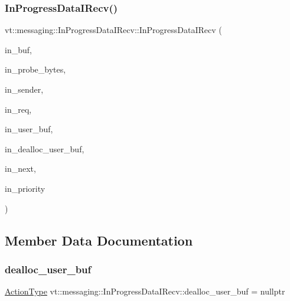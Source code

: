 \subsubsection{\texorpdfstring{In\+Progress\+Data\+I\+Recv()}{InProgressDataIRecv()}}
{\footnotesize\ttfamily vt\+::messaging\+::\+In\+Progress\+Data\+I\+Recv\+::\+In\+Progress\+Data\+I\+Recv (\begin{DoxyParamCaption}\item[{char $\ast$}]{in\+\_\+buf,  }\item[{\hyperlink{structvt_1_1messaging_1_1_in_progress_i_recv_a2a3824ca08dcfc5a3278882c1df8edd6}{Count\+Type}}]{in\+\_\+probe\+\_\+bytes,  }\item[{\hyperlink{namespacevt_a866da9d0efc19c0a1ce79e9e492f47e2}{Node\+Type}}]{in\+\_\+sender,  }\item[{M\+P\+I\+\_\+\+Request}]{in\+\_\+req,  }\item[{void $\ast$const}]{in\+\_\+user\+\_\+buf,  }\item[{\hyperlink{namespacevt_ae0a5a7b18cc99d7b732cb4d44f46b0f3}{Action\+Type}}]{in\+\_\+dealloc\+\_\+user\+\_\+buf,  }\item[{\hyperlink{namespacevt_a4dfad0b5809d9812d60a0311a45ae0c2}{R\+D\+M\+A\+\_\+\+Continuation\+Delete\+Type}}]{in\+\_\+next,  }\item[{\hyperlink{namespacevt_a86bff9f556eb761b27fc8600d006ac04}{Priority\+Type}}]{in\+\_\+priority }\end{DoxyParamCaption})\hspace{0.3cm}{\ttfamily [inline]}}



\subsection{Member Data Documentation}
\mbox{\label{structvt_1_1messaging_1_1_in_progress_data_i_recv_ad1cd80fe79577e1a22177ad1f49f8c0d}} 
\subsubsection{\texorpdfstring{dealloc\+\_\+user\+\_\+buf}{dealloc\_user\_buf}}
{\footnotesize\ttfamily \hyperlink{namespacevt_ae0a5a7b18cc99d7b732cb4d44f46b0f3}{Action\+Type} vt\+::messaging\+::\+In\+Progress\+Data\+I\+Recv\+::dealloc\+\_\+user\+\_\+buf = nullptr}

